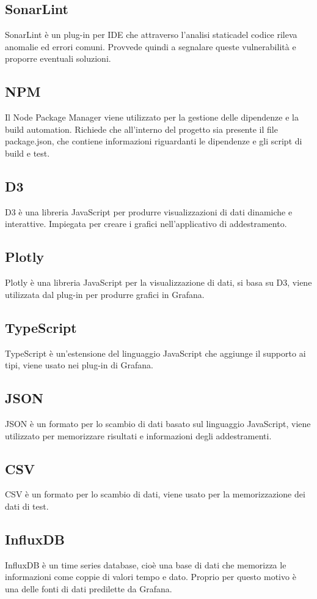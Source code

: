 	\subsection{SonarLint}
		SonarLint è un plug-in per IDE che attraverso l'analisi statica\glosp del codice rileva anomalie ed errori comuni. Provvede quindi a segnalare queste vulnerabilità e proporre eventuali soluzioni.
	\subsection{NPM}
		Il Node Package Manager viene utilizzato per la gestione delle dipendenze e la build automation.
		Richiede che all'interno del progetto sia presente il file package.json, che contiene informazioni riguardanti le dipendenze e gli script di build e test.
	\subsection{D3}
		D3 è una libreria JavaScript per produrre visualizzazioni di dati dinamiche e interattive. Impiegata per creare i grafici nell'applicativo di addestramento.
	\subsection{Plotly}
		Plotly è una libreria JavaScript per la visualizzazione di dati, si basa su D3, viene utilizzata dal plug-in per produrre grafici in Grafana\glo.
	\subsection{TypeScript}
		TypeScript è un'estensione del linguaggio JavaScript che aggiunge il supporto ai tipi, viene usato nei plug-in di Grafana\glo.
	\subsection{JSON}
		JSON è un formato per lo scambio di dati basato sul linguaggio JavaScript, viene utilizzato per memorizzare risultati e informazioni degli addestramenti.
	\subsection{CSV}
		CSV è un formato per lo scambio di dati, viene usato per la memorizzazione dei dati di test.
	\subsection{InfluxDB}
		InfluxDB è un time series database, cioè una base di dati che memorizza le informazioni come coppie di valori tempo e dato. Proprio per questo motivo è una delle fonti di dati predilette da Grafana\glo.
